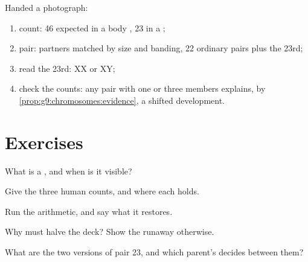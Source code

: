 \begin{method}\label{met:g9:chromosomes:read}
Handed a  photograph:
\begin{enumerate}
  \item count: 46 expected in a body , 23 in a
        ;
  \item pair: partners matched by size and banding, 22
        ordinary pairs plus the 23rd;
  \item read the 23rd: XX or XY;
  \item check the counts: any pair with one or three
        members explains, by
        \cref{prop:g9:chromosomes:evidence}, a shifted
        development.
\end{enumerate}
\end{method}

\section{Exercises}

\begin{exercise}[$\star$]\label{exo:g9:chromosomes:1}
What is a , and when is it visible?
\end{exercise}

\begin{exercise}[$\star$]\label{exo:g9:chromosomes:2}
Give the three human counts, and where each holds.
\end{exercise}

\begin{exercise}[$\star$]\label{exo:g9:chromosomes:3}
Run the  arithmetic, and say what it
restores.
\end{exercise}

\begin{exercise}[$\star$]\label{exo:g9:chromosomes:4}
Why must  halve the deck? Show the runaway
otherwise.
\end{exercise}

\begin{exercise}[$\star$]\label{exo:g9:chromosomes:5}
What are the two versions of pair 23, and which parent's
 decides between them?
\end{exercise}

